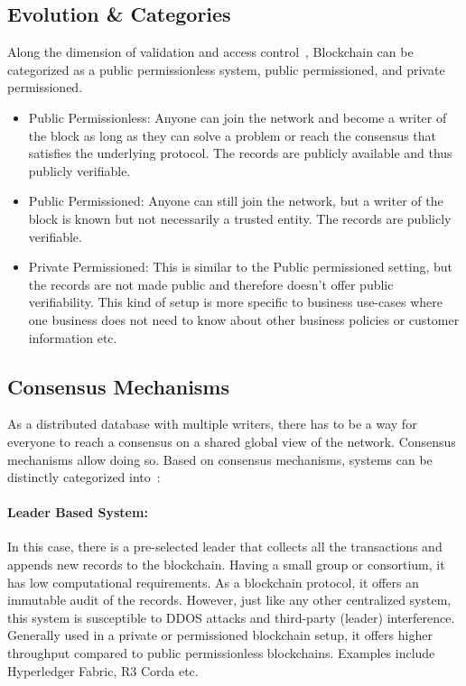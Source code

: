 \subsection{Evolution \& Categories}
Along the dimension of validation and access control~\cite{voronchenko2017you},
Blockchain can be categorized as a public permissionless system, public
permissioned, and private permissioned. 
\begin{itemize}
	\item Public Permissionless: Anyone can join the network and become a writer
		of the block as long as they can solve a problem or reach the consensus
		that satisfies the underlying protocol. The records are publicly
		available and thus publicly verifiable. 
	\item Public Permissioned: Anyone can still join the network, but a writer
		of the block is known but not necessarily a trusted entity. The records
		are publicly verifiable. 
	\item Private Permissioned: This is similar to the Public permissioned
		setting, but the records are not made public and therefore doesn't
		offer public verifiability. This kind of setup is more specific to
		business use-cases where one business does not need to know about other
		business policies or customer information etc. 
\end{itemize}
\subsection{Consensus Mechanisms}\label{subsec:consensus}
As a distributed database with multiple writers, there has to be a way for
everyone to reach a consensus on a shared global view of the network. Consensus
mechanisms allow doing so. Based on consensus mechanisms, systems can be
distinctly categorized into~\cite{HashgraphConsensusCategory}:
\paragraph{Leader Based System:} In this case, there is a pre-selected leader
that collects all the transactions and appends new records to the blockchain.
Having a small group or consortium, it has low computational requirements. As a
blockchain protocol, it offers an immutable audit of the records. However, just
like any other centralized system, this system is susceptible to DDOS attacks
and third-party (leader) interference. Generally used in a private or
permissioned blockchain setup, it offers higher throughput compared to public
permissionless blockchains. Examples include Hyperledger Fabric, R3 Corda etc. 
